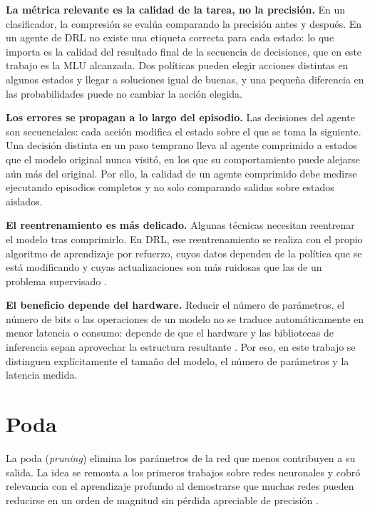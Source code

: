 \textbf{La métrica relevante es la calidad de la tarea, no la precisión.} En un clasificador, la compresión se evalúa comparando la precisión antes y después. En un agente de DRL no existe una etiqueta correcta para cada estado: lo que importa es la calidad del resultado final de la secuencia de decisiones, que en este trabajo es la MLU alcanzada. Dos políticas pueden elegir acciones distintas en algunos estados y llegar a soluciones igual de buenas, y una pequeña diferencia en las probabilidades puede no cambiar la acción elegida.

\textbf{Los errores se propagan a lo largo del episodio.} Las decisiones del agente son secuenciales: cada acción modifica el estado sobre el que se toma la siguiente. Una decisión distinta en un paso temprano lleva al agente comprimido a estados que el modelo original nunca visitó, en los que su comportamiento puede alejarse aún más del original. Por ello, la calidad de un agente comprimido debe medirse ejecutando episodios completos y no solo comparando salidas sobre estados aislados.

\textbf{El reentrenamiento es más delicado.} Algunas técnicas necesitan reentrenar el modelo tras comprimirlo. En DRL, ese reentrenamiento se realiza con el propio algoritmo de aprendizaje por refuerzo, cuyos datos dependen de la política que se está modificando y cuyas actualizaciones son más ruidosas que las de un problema supervisado \cite{graesser2022state}.

\textbf{El beneficio depende del hardware.} Reducir el número de parámetros, el número de bits o las operaciones de un modelo no se traduce automáticamente en menor latencia o consumo: depende de que el hardware y las bibliotecas de inferencia sepan aprovechar la estructura resultante \cite{hoefler2021sparsity}. Por eso, en este trabajo se distinguen explícitamente el tamaño del modelo, el número de parámetros y la latencia medida.

\section{Poda}\label{sec:poda}

La poda (\textit{pruning}) elimina los parámetros de la red que menos contribuyen a su salida. La idea se remonta a los primeros trabajos sobre redes neuronales \cite{lecun1990optimal} y cobró relevancia con el aprendizaje profundo al demostrarse que muchas redes pueden reducirse en un orden de magnitud sin pérdida apreciable de precisión \cite{han2015learning}.

